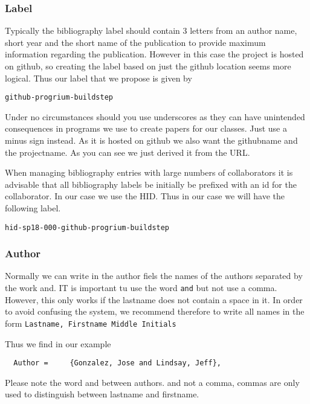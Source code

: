 \subsubsection{Label}\label{s:e:label}

Typically the bibliography label should contain 3 letters from an
author name, short year and the short name of the publication to
provide maximum information regarding the publication. However in this
case the project is hosted on github, so creating the label based on
just the github location seems more logical. Thus our label that we
propose is given by 

\verb|github-progrium-buildstep|


Under no circumstances should you use underscores as they can have unintended
consequences in programs we use to create papers for our classes. Just
use a minus sign instead. As it is hosted on github we also want the
githubname and the projectname. As you can see we just derived it from
the URL.

\begin{IU}
When managing bibliography entries with large numbers of collaborators
it is advisable that all bibliography labels be initially be prefixed
with an id for the collaborator. In our case we use the HID. Thus in
our case we will have the following label.

\verb|hid-sp18-000-github-progrium-buildstep|

\end{IU}


\subsubsection{Author}\label{s:e:author}

Normally we can write in the author fiels the names of the authors
separated by the work and. IT is important tu use the word \verb|and|
but not use a comma. However, this only works if the lastname does not
contain a space in it. In order to avoid confusing the system, we
recommend therefore to write all names in the form
\verb|Lastname, Firstname Middle Initials|

Thus we find in our example

\verb|  Author =     {Gonzalez, Jose and Lindsay, Jeff},|

\begin{WARNING}
Please note the word and between authors. and not a comma, commas are
only used to distinguish between lastname and firstname.
\end{WARNING}


